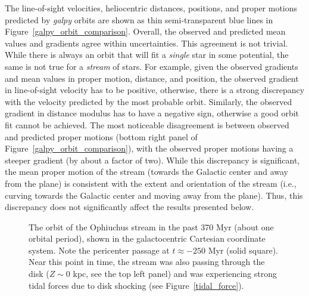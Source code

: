 \documentclass[iop]{emulateapj}
\begin{document}
\begin{figure*}
\caption{
This plot compares line-of-sight velocities ({\em top left}), distances
({\em top right}), positions ({\em bottom left}), and proper motions
({\em bottom right}) calculated by {\em galpy} (thin blue lines) with models
derived from observations (thin red lines). The observed and calculated values
are consistent within uncertainties, with the exception of the proper motions,
where the model cannot match the apparent gradient of the proper motions along
the stream.
\label{galpy_orbit_comparison}}
\end{figure*}

The line-of-sight velocities, heliocentric distances, positions, and proper
motions predicted by {\em galpy} orbits are shown as thin semi-transparent blue
lines in Figure~\ref{galpy_orbit_comparison}. Overall, the observed and
predicted mean values and gradients agree within uncertainties. This agreement
is not trivial. While there is always an orbit that will fit a {\em single} star
in some potential, the same is not true for a {\em stream} of stars. For
example, given the observed gradients and mean values in proper motion,
distance, and position, the observed gradient in line-of-sight velocity has to
be positive, otherwise, there is a strong discrepancy with the velocity
predicted by the most probable orbit. Similarly, the observed gradient in
distance modulus has to have a negative sign, otherwise a good orbit fit cannot 
be achieved. The most noticeable disagreement is between observed and predicted
proper motions (bottom right panel of Figure~\ref{galpy_orbit_comparison}), with
the observed proper motions having a steeper gradient (by about a factor of
two). While this discrepancy is significant, the mean proper motion of the
stream (towards the Galactic center and away from the plane) is consistent with
the extent and orientation of the stream (i.e., curving towards the Galactic
center and moving away from the plane). Thus, this discrepancy does not
significantly affect the results presented below.

\begin{figure}
\caption{
The orbit of the Ophiuchus stream in the past 370 Myr (about one orbital
period), shown in the galactocentric Cartesian coordinate system. Note the
pericenter passage at $t\approx-250$ Myr (solid square). Near this point in
time, the stream was also passing through the disk ($Z\sim0$ kpc, see the top
left panel) and was experiencing strong tidal forces due to disk shocking
(see Figure~\ref{tidal_force}).
\label{orbit_XYZ}}
\end{figure}
\end{document}
